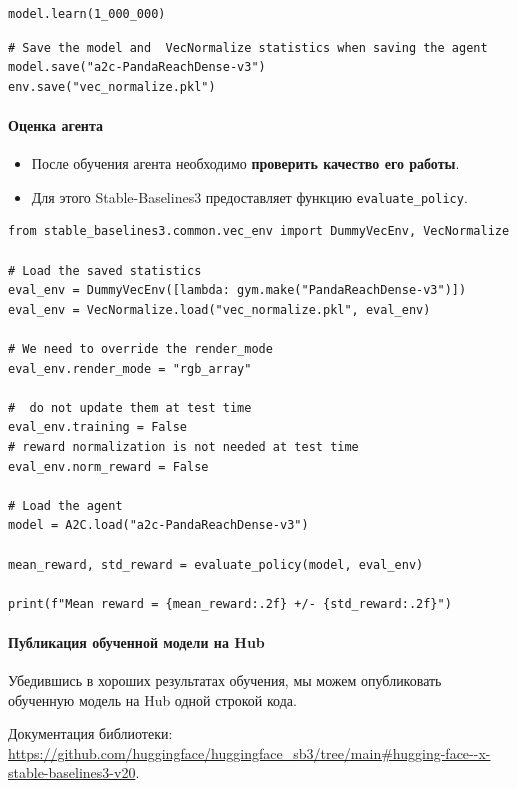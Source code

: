 \documentclass[11pt,a4paper]{article}
\begin{document}
\begin{lstlisting}
model.learn(1_000_000)
\end{lstlisting}

\begin{lstlisting}
# Save the model and  VecNormalize statistics when saving the agent
model.save("a2c-PandaReachDense-v3")
env.save("vec_normalize.pkl")
\end{lstlisting}

\paragraph{Оценка агента}\label{evaluate-the-agent}

\begin{itemize}
\tightlist
\item
  После обучения агента необходимо \textbf{проверить качество его работы}.
\item
  Для этого Stable-Baselines3 предоставляет функцию \texttt{evaluate\_policy}.
\end{itemize}

\begin{lstlisting}
from stable_baselines3.common.vec_env import DummyVecEnv, VecNormalize

# Load the saved statistics
eval_env = DummyVecEnv([lambda: gym.make("PandaReachDense-v3")])
eval_env = VecNormalize.load("vec_normalize.pkl", eval_env)

# We need to override the render_mode
eval_env.render_mode = "rgb_array"

#  do not update them at test time
eval_env.training = False
# reward normalization is not needed at test time
eval_env.norm_reward = False

# Load the agent
model = A2C.load("a2c-PandaReachDense-v3")

mean_reward, std_reward = evaluate_policy(model, eval_env)

print(f"Mean reward = {mean_reward:.2f} +/- {std_reward:.2f}")
\end{lstlisting}

\paragraph{Публикация обученной модели на Hub}\label{publish-your-trained-model-on-the-hub}

Убедившись в хороших результатах обучения, мы можем опубликовать обученную модель на Hub одной строкой кода.

Документация библиотеки: \url{https://github.com/huggingface/huggingface_sb3/tree/main#hugging-face--x-stable-baselines3-v20}.
\end{document}
